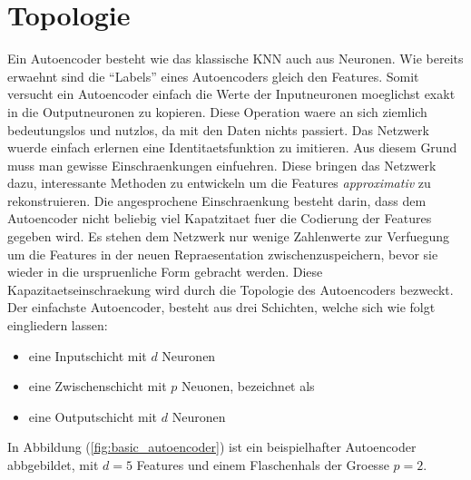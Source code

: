 \section{Topologie}
Ein Autoencoder besteht wie das klassische KNN auch aus Neuronen.
Wie bereits erwaehnt sind die ``Labels'' eines Autoencoders gleich
den Features. Somit versucht ein Autoencoder einfach die Werte der Inputneuronen
moeglichst exakt in die Outputneuronen zu kopieren.
Diese Operation waere an sich ziemlich bedeutungslos und nutzlos, da mit den
Daten nichts passiert. Das Netzwerk wuerde einfach erlernen eine
Identitaetsfunktion zu imitieren.
Aus diesem Grund muss man gewisse Einschraenkungen einfuehren. Diese bringen das Netzwerk dazu,
interessante Methoden zu entwickeln um die Features \textit{approximativ} zu rekonstruieren.
\para{}
Die angesprochene Einschraenkung besteht darin, dass dem Autoencoder nicht
beliebig viel Kapatzitaet fuer die Codierung der Features gegeben wird.
Es stehen dem Netzwerk nur wenige Zahlenwerte zur Verfuegung um die Features
in der neuen Repraesentation zwischenzuspeichern, bevor sie wieder in die urspruenliche Form gebracht werden.
Diese Kapazitaetseinschraekung wird durch die Topologie des Autoencoders bezweckt.
\para{}
\bigskip
Der einfachste Autoencoder, besteht aus drei Schichten, welche sich wie folgt
eingliedern lassen:
\begin{itemize}
  \item{eine Inputschicht mit $d$ Neuronen}
  \item{eine Zwischenschicht mit $p$ Neuonen, bezeichnet als }
  \item{eine Outputschicht mit $d$ Neuronen}
\end{itemize}
In Abbildung (\ref{fig:basic_autoencoder}) ist
ein beispielhafter Autoencoder abbgebildet, mit $d = 5$ Features und einem
Flaschenhals der Groesse $p = 2$.
